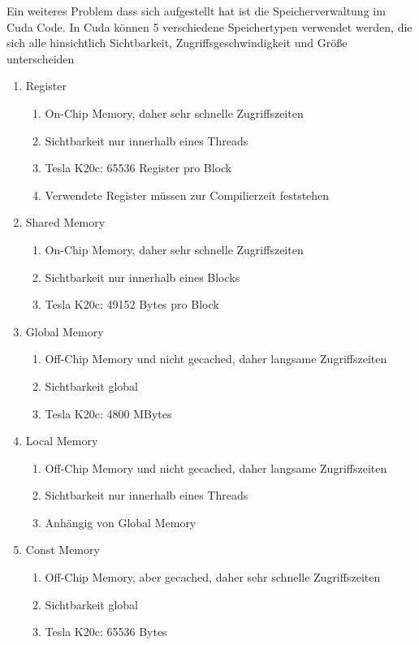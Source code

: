 Ein weiteres Problem dass sich aufgestellt hat ist die Speicherverwaltung im Cuda Code. In Cuda können 5 verschiedene Speichertypen verwendet werden, die sich alle hinsichtlich Sichtbarkeit, Zugriffsgeschwindigkeit und Größe unterscheiden

\begin{enumerate}
\item Register
	\begin{enumerate}
	\item On-Chip Memory, daher sehr schnelle Zugriffszeiten
	\item Sichtbarkeit nur innerhalb eines Threads
	\item Tesla K20c: 65536 Register pro Block
	\item Verwendete Register müssen zur Compilierzeit feststehen
	\end{enumerate}
\item Shared Memory
	\begin{enumerate}
	\item On-Chip Memory, daher sehr schnelle Zugriffszeiten
	\item Sichtbarkeit nur innerhalb eines Blocks
	\item Tesla K20c: 49152 Bytes pro Block
	\end{enumerate}
\item Global Memory
	\begin{enumerate}
	\item Off-Chip Memory und nicht gecached, daher langsame Zugriffszeiten
	\item Sichtbarkeit global
	\item Tesla K20c: 4800 MBytes
	\end{enumerate}
\item Local Memory
	\begin{enumerate}
	\item Off-Chip Memory und nicht gecached, daher langsame Zugriffszeiten
	\item Sichtbarkeit nur innerhalb eines Threads
	\item Anhängig von Global Memory
	\end{enumerate}
\item Const Memory
	\begin{enumerate}
	\item Off-Chip Memory, aber gecached, daher sehr schnelle Zugriffszeiten
	\item Sichtbarkeit global
	\item Tesla K20c: 65536 Bytes
	\end{enumerate}
\end{enumerate}

